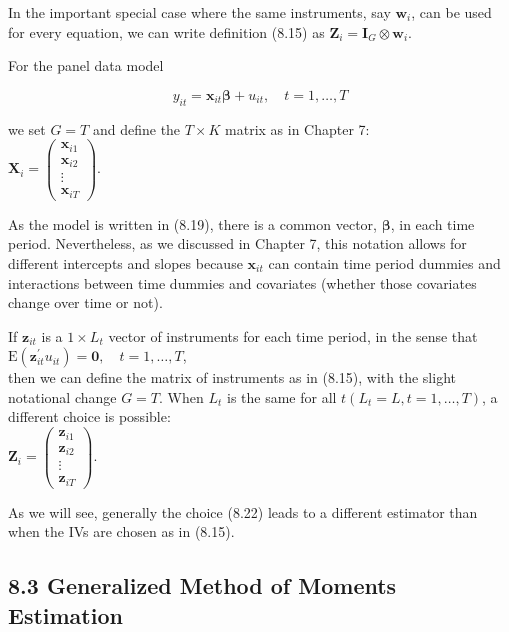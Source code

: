\documentclass[10pt]{article}
\begin{document}
In the important special case where the same instruments, say $\mathbf{w}_{i}$, can be used for every equation, we can write definition (8.15) as $\mathbf{Z}_{i}=\mathbf{I}_{G} \otimes \mathbf{w}_{i}$.

For the panel data model


\begin{equation*}
y_{i t}=\mathbf{x}_{i t} \boldsymbol{\beta}+u_{i t}, \quad t=1, \ldots, T \tag{8.19}
\end{equation*}


we set $G=T$ and define the $T \times K$ matrix as in Chapter 7:\\
$\mathbf{X}_{i}=\left(\begin{array}{c}\mathbf{x}_{i 1} \\ \mathbf{x}_{i 2} \\ \vdots \\ \mathbf{x}_{i T}\end{array}\right)$.

As the model is written in (8.19), there is a common vector, $\boldsymbol{\beta}$, in each time period. Nevertheless, as we discussed in Chapter 7, this notation allows for different intercepts and slopes because $\mathbf{x}_{i t}$ can contain time period dummies and interactions between time dummies and covariates (whether those covariates change over time or not).

If $\mathbf{z}_{i t}$ is a $1 \times L_{t}$ vector of instruments for each time period, in the sense that\\
$\mathrm{E}\left(\mathbf{z}_{i t}^{\prime} u_{i t}\right)=\mathbf{0}, \quad t=1, \ldots, T$,\\
then we can define the matrix of instruments as in (8.15), with the slight notational change $G=T$. When $L_{t}$ is the same for all $t\left(L_{t}=L, t=1, \ldots, T\right)$, a different choice is possible:\\
$\mathbf{Z}_{i}=\left(\begin{array}{c}\mathbf{z}_{i 1} \\ \mathbf{z}_{i 2} \\ \vdots \\ \mathbf{z}_{i T}\end{array}\right)$.

As we will see, generally the choice (8.22) leads to a different estimator than when the IVs are chosen as in (8.15).

\subsection*{8.3 Generalized Method of Moments Estimation}
\end{document}
